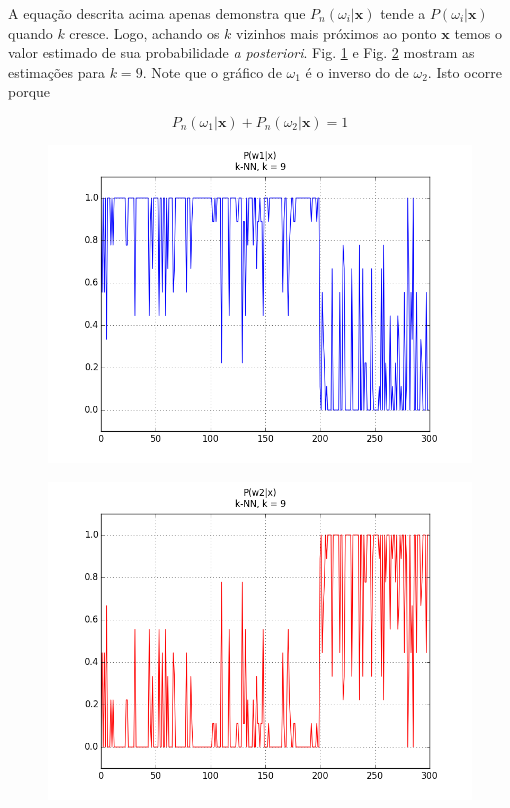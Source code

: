 \documentclass[12pt,twoside]{report}
\newcommand{\figureref}[1]{Fig. \ref{fig:#1}}
\begin{document}
A equação descrita acima apenas demonstra que $P_n(\omega_i|\mathbf{x})$ tende a
$P(\omega_i|\mathbf{x})$ quando $k$ cresce. Logo, achando os $k$ vizinhos mais
próximos ao ponto $\mathbf{x}$ temos o valor estimado de sua probabilidade
\emph{a posteriori}. \figureref{kNN-k9-P_w1_given_x} e \figureref{kNN-k9-P_w2_given_x}
mostram as estimações para $k = 9$. Note que o gráfico de $\omega_1$ é o inverso
do de $\omega_2$. Isto ocorre porque

\begin{equation}
P_n(\omega_1|\mathbf{x}) + P_n(\omega_2|\mathbf{x}) = 1
\label{eq:sum_prob_posteriori}
\end{equation}

\begin{figure}[ht]
    \centering
    \includegraphics[scale=0.75]{kNN-k9-P_w1_given_x}
    \caption{}
    \label{fig:kNN-k9-P_w1_given_x}
\end{figure}

\begin{figure}[ht]
    \centering
    \includegraphics[scale=0.75]{kNN-k9-P_w2_given_x}
    \caption{}
    \label{fig:kNN-k9-P_w2_given_x}
\end{figure}
\end{document}
